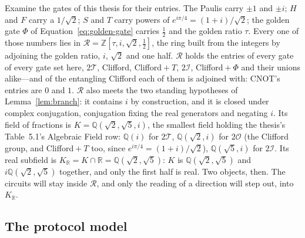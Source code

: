 \documentclass[11pt,a4paper]{article}
\newcommand{\R}{\mathbb{R}}
\newcommand{\Tgroup}{\mathcal{T}}
\newcommand{\Ogroup}{\mathcal{O}}
\newcommand{\Igroup}{\mathcal{I}}
\newcommand{\TwoT}{2\Tgroup}
\newcommand{\TwoO}{2\Ogroup}
\newcommand{\TwoI}{2\Igroup}
\newcommand{\phig}{\tau}      %
\begin{document}
Examine the gates of this thesis for their entries. The Paulis carry $\pm 1$ and $\pm i$; $H$ and $F$ carry a $1/\sqrt{2}$; $S$ and $T$ carry powers of $e^{i\pi/4} = (1+i)/\sqrt{2}$; the golden gate $\Phi$ of Equation~\eqref{eq:golden-gate} carries $\tfrac{1}{2}$ and the golden ratio $\phig$. Every one of those numbers lies in $\mathcal{R} = \mathbb{Z}[\phig, i, \sqrt{2}, \tfrac{1}{2}]$, the ring built from the integers by adjoining the golden ratio, $i$, $\sqrt{2}$ and one half. $\mathcal{R}$ holds the entries of every gate of every gate set here, $\TwoT$, Clifford, Clifford${}+T$, $\TwoI$, Clifford${}+\Phi$ and their unions alike---and of the entangling Clifford each of them is adjoined with: CNOT's entries are $0$ and $1$. $\mathcal{R}$ also meets the two standing hypotheses of Lemma~\ref{lem:branch}: it contains $i$ by construction, and it is closed under complex conjugation, conjugation fixing the real generators and negating $i$. Its field of fractions is $K = \mathbb{Q}(\sqrt{2},\sqrt{5},i)$, the smallest field holding the thesis's Table~5.1's Algebraic Field row: $\mathbb{Q}(i)$ for $\TwoT$, $\mathbb{Q}(\sqrt{2}, i)$ for $\TwoO$ (the Clifford group, and Clifford${}+T$ too, since $e^{i\pi/4} = (1+i)/\sqrt{2}$), $\mathbb{Q}(\sqrt{5}, i)$ for $\TwoI$. Its real subfield is $K_\R = K \cap \R = \mathbb{Q}(\sqrt{2},\sqrt{5})$: $K$ is $\mathbb{Q}(\sqrt{2},\sqrt{5})$ and $i\mathbb{Q}(\sqrt{2},\sqrt{5})$ together, and only the first half is real. Two objects, then. The circuits will stay inside $\mathcal{R}$, and only the reading of a direction will step out, into $K_\R$.

\subsection{The protocol model}
\end{document}
